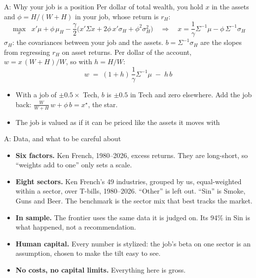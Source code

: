 \documentclass[aspectratio=169,10pt]{beamer}
\begin{document}
\begin{frame}[label=appendix_hc]{A: Why your job is a position}
Per dollar of total wealth, you hold $x$ in the assets and $\phi = H/(W+H)$ in your job, whose return is $r_{H}$:
\[ \max_{x}\;\; x'\mu + \phi\,\mu_{H} - \frac{\gamma}{2}\Big(x'\Sigma x + 2\phi\, x'\sigma_{H} + \phi^{2}\sigma_{H}^{2}\Big) \quad\Rightarrow\quad x = \frac{1}{\gamma}\Sigma^{-1}\mu - \phi\,\Sigma^{-1}\sigma_{H} \]
{\small $\sigma_{H}$: the covariances between your job and the assets. $b = \Sigma^{-1}\sigma_{H}$ are the slopes from regressing $r_{H}$ on asset returns.}
\vskip 8pt
Per dollar of the account, $w = x\,(W+H)/W$, so with $h = H/W$:
\[ w \;=\; (1+h)\,\frac{1}{\gamma}\Sigma^{-1}\mu \;-\; h\,b \]
\begin{itemize}
\item With a job of $\pm 0.5\times$ Tech, $b$ is $\pm 0.5$ in Tech and zero elsewhere. Add the job back: $\frac{W}{W+H}\,w + \phi\,b = x^{\star}$, the star.
\vskip 4pt
\item The job is valued as if it can be priced like the assets it moves with
\end{itemize}
\hfill \hyperlink{back_hc}{}
\end{frame}

\begin{frame}{A: Data, and what to be careful about}
\begin{itemize}
\item \textbf{Six factors.} Ken French, 1980--2026, excess returns. They are long-short, so ``weights add to one'' only sets a scale.
\vskip 8pt
\item \textbf{Eight sectors.} Ken French's 49 industries, grouped by us, equal-weighted within a sector, over T-bills, 1980--2026. ``Other'' is left out. ``Sin'' is Smoke, Guns and Beer. The benchmark is the sector mix that best tracks the market.
\vskip 8pt
\item \textbf{In sample.} The frontier uses the same data it is judged on. Its 94\% in Sin is what happened, not a recommendation.
\vskip 8pt
\item \textbf{Human capital.} Every number is stylized: the job's beta on one sector is an assumption, chosen to make the tilt easy to see.
\vskip 8pt
\item \textbf{No costs, no capital limits.} Everything here is gross.
\end{itemize}
\end{frame}
\end{document}
